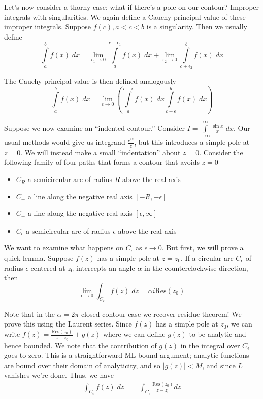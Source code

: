 \documentclass[10pt]{report}
\newcommand{\abs}[1]{\left|#1\right|}
\newcommand{\Res}[0]{\mathrm{Res} }
\begin{document}
Let's now consider a thorny case; what if there's a pole on our contour? Improper integrals with singularities. We again define a Cauchy principal value of these improper integrals. Suppose $f(c), a < c < b$ is a singularity. Then we usually define
$$\displaystyle\int\limits_{a}^{b}f(x)\;dx = \lim_{\epsilon_1 \to 0}\displaystyle\int\limits_{a}^{c-\epsilon_1}f(x)\; dx + \lim_{\epsilon_2 \to 0}\displaystyle\int\limits_{c+\epsilon_2}^bf(x)\; dx$$

The Cauchy principal value is then defined analogously
$$\displaystyle\int\limits_{a}^{b}f(x)\;dx = \lim_{\epsilon \to 0}\left(\displaystyle\int\limits_{a}^{c-\epsilon}f(x)\; dx \displaystyle\int\limits_{c+\epsilon}^bf(x)\; dx\right)$$

Suppose we now examine an ``indented contour.'' Consider $I = \displaystyle\int\limits_{-\infty}^{\infty}\frac{\sin x}{x}\;dx$. Our usual methods would give us integrand $\frac{e^{iz}}{z}$, but this introduces a simple pole at $z=0$. We will instead make a small ``indentation'' about $z=0$. Consider the following family of four paths that forms a contour that avoids $z=0$
\begin{itemize}
    \item $C_R$ a semicircular arc of radius $R$ above the real axis
    \item $C_-$ a line along the negative real axis $[-R,-\epsilon]$
    \item $C_+$ a line along the negative real axis $[\epsilon,\infty]$
    \item $C_\epsilon$ a semicircular arc of radius $\epsilon$ above the real axis
\end{itemize}

We want to examine what happens on $C_\epsilon$ as $\epsilon \to 0$. But first, we will prove a quick lemma. Suppose $f(z)$ has a simple pole at $z = z_0$. If a circular arc $C_\epsilon$ of radius $\epsilon$ centered at $z_0$ intercepts an angle $\alpha$ in the counterclockwise direction, then
$$\lim_{\epsilon \to 0}\int_{C_\epsilon} f(z) \; dz = \alpha i\Res(z_0)$$

Note that in the $\alpha = 2\pi$ closed contour case we recover residue theorem! We prove this using the Laurent series. Since $f(z)$ has a simple pole at $z_0$, we can write $f(z) = \frac{\Res(z_0)}{z-z_0} + g(z)$ where we can define $g(z)$ to be analytic and hence bounded. We note that the contribution of $g(z)$ in the integral over $C_\epsilon$ goes to zero. This is a straightforward ML bound argument; analytic functions are bound over their domain of analyticity, and so $\abs{g(z)} < M$, and since $L$ vanishes we're done. Thus, we have
\begin{align*}
    \int_{C_\epsilon} f(z)\; dz &= \int_{C_\epsilon} \frac{\Res(z_0)}{z-z_0}dz
\end{align*}
\end{document}
